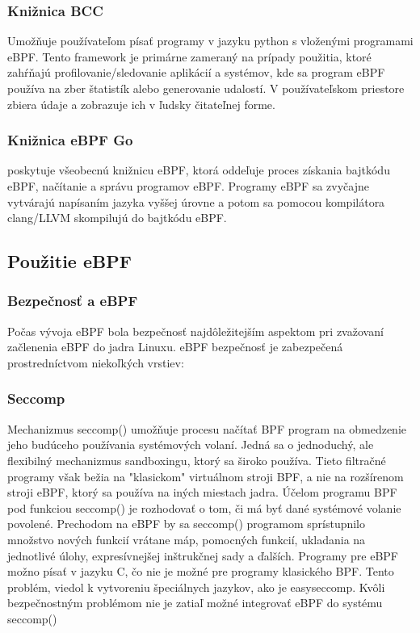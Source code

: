 \subsubsection{Knižnica BCC}
Umožňuje používateľom písať programy v jazyku python s vloženými programami eBPF.  
Tento framework je primárne zameraný na prípady použitia, ktoré zahŕňajú profilovanie/sledovanie aplikácií a systémov, 
kde sa program eBPF používa na zber štatistík alebo generovanie udalostí. V používateľskom priestore zbiera údaje 
a zobrazuje ich v ľudsky čitateľnej forme. 

\subsubsection{Knižnica eBPF Go}
poskytuje všeobecnú knižnicu eBPF, ktorá oddeľuje proces získania bajtkódu eBPF, načítanie a správu programov eBPF. 
Programy eBPF sa zvyčajne vytvárajú napísaním jazyka vyššej úrovne a potom sa pomocou kompilátora clang/LLVM skompilujú do bajtkódu eBPF.

\subsection{Použitie eBPF}
\subsubsection{Bezpečnosť a eBPF}
Počas vývoja eBPF bola bezpečnosť najdôležitejším aspektom pri zvažovaní začlenenia eBPF do jadra Linuxu. 
eBPF bezpečnosť je zabezpečená prostredníctvom niekoľkých vrstiev:

\subsubsection{Seccomp}
Mechanizmus seccomp() umožňuje procesu načítať BPF program na obmedzenie jeho budúceho používania systémových volaní.
Jedná sa o jednoduchý, ale flexibilný mechanizmus sandboxingu, ktorý sa široko používa. 
Tieto filtračné programy však bežia na "klasickom" virtuálnom stroji BPF, a nie na rozšírenom stroji eBPF, ktorý sa používa na iných miestach jadra. 
Účelom programu BPF pod funkciou seccomp() je rozhodovať o tom, či má byť dané systémové volanie povolené.
Prechodom na eBPF by sa seccomp() programom sprístupnilo množstvo nových funkcií vrátane máp, pomocných funkcií, ukladania na jednotlivé úlohy, 
expresívnejšej inštrukčnej sady a ďalších. 
Programy pre eBPF možno písať v jazyku C, čo nie je možné pre programy klasického BPF. 
Tento problém, viedol k vytvoreniu špeciálnych jazykov, ako je easyseccomp. 
Kvôli bezpečnostným problémom nie je zatiaľ možné integrovať eBPF do systému seccomp()

